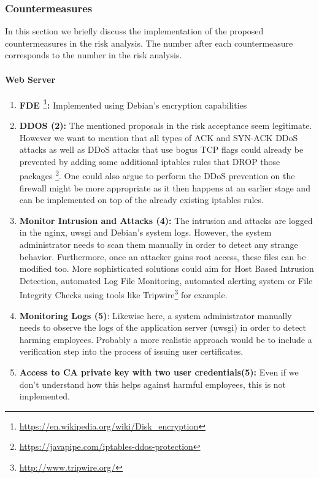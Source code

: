 \documentclass[english]{article}
\begin{document}
\subsubsection{Countermeasures}
In this section we briefly discuss the implementation of the proposed countermeasures in the risk analysis. The number after each countermeasure corresponds to the number in the risk analysis.

\paragraph{Web Server}
\begin{enumerate}[label=(\alph*)] 
\item \textbf{FDE \footnote{\url{https://en.wikipedia.org/wiki/Disk_encryption}}:} Implemented using Debian's encryption capabilities 
\item \textbf{DDOS (2):} The mentioned proposals in the risk acceptance seem legitimate. However we want to mention that all types of ACK and SYN-ACK DDoS attacks as well as DDoS attacks that use bogus TCP flags could already be prevented by adding some additional iptables rules that DROP those packages \footnote{\url{https://javapipe.com/iptables-ddos-protection}}. One could also argue to perform the DDoS prevention on the firewall might be more appropriate as it then happens at an earlier stage and can be implemented on top of the already existing iptables rules.
\item \textbf{Monitor Intrusion and Attacks (4):} The intrusion and attacks are logged in the nginx, uwsgi and Debian's system logs. However, the system administrator needs to scan them manually in order to detect any strange behavior. Furthermore, once an attacker gains root access, these files can be modified too. More sophisticated solutions could aim for Host Based Intrusion Detection, automated Log File Monitoring, automated alerting system or File Integrity Checks using tools like Tripwire\footnote{\url{http://www.tripwire.org/}} for example.
\item \textbf{Monitoring Logs (5)}: Likewise here, a system administrator manually needs to observe the logs of the application server (uwsgi) in order to detect harming employees. Probably a more realistic approach would be to include a verification step into the process of issuing user certificates.
\item \textbf{Access to CA private key with two user credentials(5):} Even if we don't understand how this helps against harmful employees, this is not implemented.
\end{enumerate} 
\end{document}
